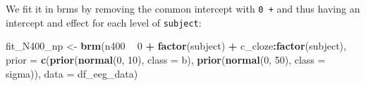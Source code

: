 \documentclass[12pt,ignorenonframetext,aspectratio=169]{beamer}
\newenvironment{Shaded}{\begin{snugshade}}{\end{snugshade}}
\newcommand{\DataTypeTok}[1]{\textcolor[rgb]{0.13,0.29,0.53}{#1}}
\newcommand{\DecValTok}[1]{\textcolor[rgb]{0.00,0.00,0.81}{#1}}
\newcommand{\KeywordTok}[1]{\textcolor[rgb]{0.13,0.29,0.53}{\textbf{#1}}}
\newcommand{\NormalTok}[1]{#1}
\newcommand{\OperatorTok}[1]{\textcolor[rgb]{0.81,0.36,0.00}{\textbf{#1}}}
\newcommand{\StringTok}[1]{\textcolor[rgb]{0.31,0.60,0.02}{#1}}
\begin{document}
\begin{frame}[fragile]

We fit it in brms by removing the common intercept with \texttt{0\ +} and thus having an intercept and effect for each level of \texttt{subject}:

\scriptsize

\begin{Shaded}
\begin{Highlighting}[]
\NormalTok{fit_N400_np <-}\StringTok{ }\KeywordTok{brm}\NormalTok{(n400 }\OperatorTok{~}\StringTok{ }\DecValTok{0} \OperatorTok{+}
\StringTok{                     }\KeywordTok{factor}\NormalTok{(subject) }\OperatorTok{+}\StringTok{ }\NormalTok{c_cloze}\OperatorTok{:}\KeywordTok{factor}\NormalTok{(subject),}
                 \DataTypeTok{prior =}
                     \KeywordTok{c}\NormalTok{(}\KeywordTok{prior}\NormalTok{(}\KeywordTok{normal}\NormalTok{(}\DecValTok{0}\NormalTok{, }\DecValTok{10}\NormalTok{), }\DataTypeTok{class =}\NormalTok{ b),}
                       \KeywordTok{prior}\NormalTok{(}\KeywordTok{normal}\NormalTok{(}\DecValTok{0}\NormalTok{, }\DecValTok{50}\NormalTok{), }\DataTypeTok{class =}\NormalTok{ sigma)),}
                 \DataTypeTok{data =}\NormalTok{ df_eeg_data)}
\end{Highlighting}
\end{Shaded}

\normalsize

\end{frame}
\end{document}
